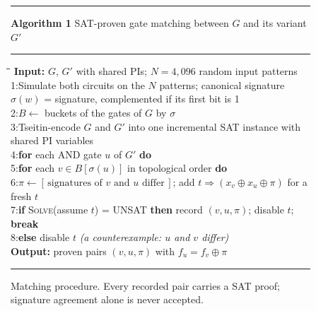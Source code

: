 \begin{figure}[h]
\centering
\begin{minipage}{0.92\textwidth}
\hrule\smallskip
\textbf{Algorithm 1} SAT-proven gate matching between $G$ and its variant $G'$\smallskip\hrule\smallskip
\begin{tabbing}
\quad\=\quad\=\quad\=\kill
\textbf{Input:} $G$, $G'$ with shared PIs; $N=4{,}096$ random input patterns\\
1:\>Simulate both circuits on the $N$ patterns; canonical signature $\sigma(w)$ = signature, complemented if its first bit is 1\\
2:\>$B\leftarrow$ buckets of the gates of $G$ by $\sigma$\\
3:\>Tseitin-encode $G$ and $G'$ into one incremental SAT instance with shared PI variables\\
4:\>\textbf{for} each AND gate $u$ of $G'$ \textbf{do}\\
5:\>\>\textbf{for} each $v\in B[\sigma(u)]$ in topological order \textbf{do}\\
6:\>\>\>$\pi\leftarrow[\,\text{signatures of } v \text{ and } u \text{ differ}\,]$; add $t\Rightarrow(x_v\oplus x_u\oplus\pi)$ for a fresh $t$\\
7:\>\>\>\textbf{if} \textsc{Solve}(assume $t$) = UNSAT \textbf{then} record $(v,u,\pi)$; disable $t$; \textbf{break}\\
8:\>\>\>\textbf{else} disable $t$ \quad\emph{(a counterexample: $u$ and $v$ differ)}\\
\textbf{Output:} proven pairs $(v,u,\pi)$ with $f_u=f_v\oplus\pi$
\end{tabbing}
\hrule
\end{minipage}
\caption{Matching procedure. Every recorded pair carries a SAT proof; signature agreement alone is never accepted.}
\label{alg:match}
\end{figure}

